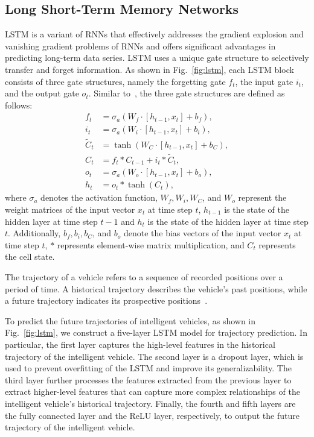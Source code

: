 \documentclass[lettersize,journal]{IEEEtran}
\begin{document}
\subsection{Long Short-Term Memory Networks} 
LSTM is a variant of RNNs that effectively addresses the gradient explosion and vanishing gradient problems of RNNs and offers significant advantages in predicting long-term data series. LSTM uses a unique gate structure to selectively transfer and forget information. As shown in Fig.~\ref{fig:lstm}, each LSTM block consists of three gate structures, namely the forgetting gate $f_t$, the input gate $i_t$, and the output gate $o_t$. Similar to~\cite{yu2019review}, the three gate structures are defined as follows:
\begin{align}
f_{t} &= \sigma_{a}\left(W_{f} \cdot\left[h_{t-1}, x_{t}\right]+b_{f}\right), \\
i_{t} &= \sigma_{a}\left(W_{i} \cdot\left[h_{t-1}, x_{t}\right]+b_{i}\right), \\
\tilde{C}_{t} &= \tanh \left(W_{C} \cdot\left[h_{t-1}, x_{t}\right]+b_{C}\right), \\
C_{t} &= f_{t} * C_{t-1}+i_{t} * \tilde{C}_{t}, \\
o_{t} &= \sigma_{a}\left(W_{o} \cdot\left[h_{t-1}, x_{t}\right]+b_{o}\right), \\
h_{t} &= o_{t} * \tanh \left(C_{t}\right),
\end{align}
where $\sigma_{a}$ denotes the activation function, $W_f, W_i, W_C$, and $W_o$ represent the weight matrices of the input vector $x_t$ at time step $t$, $h_{t-1}$ is the state of the hidden layer at time step $t-1$ and $h_{t}$ is the state of the hidden layer at time step $t$. Additionally, $b_f, b_i, b_C$, and $b_o$ denote the bias vectors of the input vector $x_t$ at time step $t$, $*$ represents element-wise matrix multiplication, and $C_t$ represents the cell state.

The trajectory of a vehicle refers to a sequence of recorded positions over a period of time. A historical trajectory describes the vehicle's past positions, while a future trajectory indicates its prospective positions~\cite{ip2021vehiclelstm}.

To predict the future trajectories of intelligent vehicles, as shown in Fig.~\ref{fig:lstm}, we construct a five-layer LSTM model for trajectory prediction. In particular, the first layer captures the high-level features in the historical trajectory of the intelligent vehicle. The second layer is a dropout layer, which is used to prevent overfitting of the LSTM and improve its generalizability. The third layer further processes the features extracted from the previous layer to extract higher-level features that can capture more complex relationships of the intelligent vehicle's historical trajectory. Finally, the fourth and fifth layers are the fully connected layer and the ReLU layer, respectively, to output the future trajectory of the intelligent vehicle.
\end{document}

